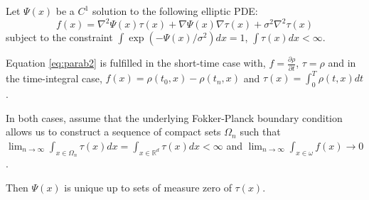 \documentclass{article}
\begin{document}
\begin{thm}\label{thm:uniqueop2}
Let $\Psi(x)$ be a $C^1$ solution to the following elliptic PDE:
\begin{equation}
\label{eq:parab2}
f(x) = \nabla^2 \Psi(x) \tau(x) + \nabla \Psi(x) \nabla \tau(x) + \sigma^2 \nabla^2 \tau(x)
\end{equation}
subject to the constraint $\int \exp(-\Psi(x)/\sigma^2) dx = 1$, $\int \tau(x)dx < \infty$.

Equation \ref{eq:parab2} is fulfilled in the short-time case with, $f=\frac{\partial \rho}{\partial t}$, $\tau = \rho$ and in the time-integral case, $f(x)=\rho(t_0,x)-\rho(t_n,x)$ and $\tau(x) = \int_0^T \rho(t,x)dt$.

In both cases, assume that the underlying Fokker-Planck boundary condition allows us to construct a sequence of compact sets $\Omega_n$ such that $\lim_{n\to\infty} \int_{x\in \Omega_n} \tau(x)dx = \int_{x\in\mathbb{R}^d} \tau(x)dx < \infty$ and $\lim_{n\to \infty} \int_{x\in \omega} f(x)\to 0$.

 Then $\Psi(x)$ is unique up to sets of measure zero of $\tau(x)$.
\end{thm}
\end{document}

